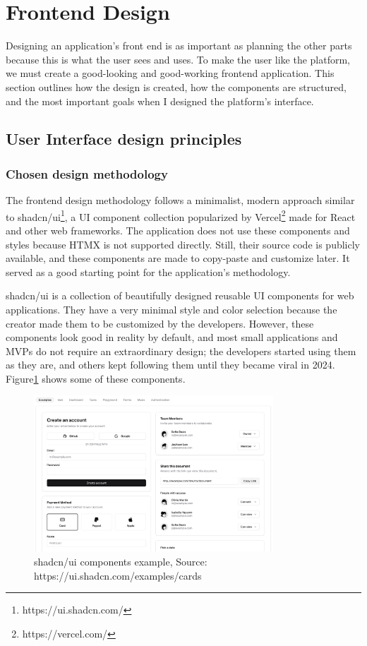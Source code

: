\section{Frontend Design}

Designing an application's front end is as important as planning the other parts because this is what the user sees and uses. To make the user like the platform, we must create a good-looking and good-working frontend application. This section outlines how the design is created, how the components are structured, and the most important goals when I designed the platform's interface.

\subsection{User Interface design principles}

\subsubsection{Chosen design methodology}

The frontend design methodology follows a minimalist, modern approach similar to shadcn/ui\footnote{https://ui.shadcn.com/}, a UI component collection popularized by Vercel\footnote{https://vercel.com/} made for React and other web frameworks. The application does not use these components and styles because HTMX is not supported directly. Still, their source code is publicly available, and these components are made to copy-paste and customize later. It served as a good starting point for the application's methodology.

shadcn/ui is a collection of beautifully designed reusable UI components for web applications. They have a very minimal style and color selection because the creator made them to be customized by the developers. However, these components look good in reality by default, and most small applications and MVPs do not require an extraordinary design; the developers started using them as they are, and others kept following them until they became viral in 2024. Figure\ref{fig:shadcn} shows some of these components.

\begin{figure}[H]
    \centering
    \includegraphics[width=0.8\textwidth, keepaspectratio]{figures/shadcn-example.png}
    \caption{shadcn/ui components example, Source: https://ui.shadcn.com/examples/cards}
    \label{fig:shadcn}
\end{figure}

